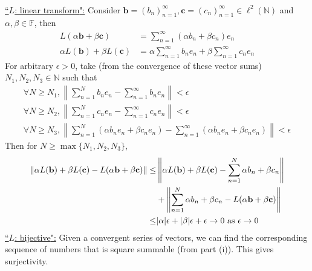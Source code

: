 \documentclass[12pt,a4paper]{article}
\newcommand{\ra}[1]{\ifnum #1=1\rightarrow\fi\ifnum #1=2\Rightarrow\fi}
\newcommand{\claim}[1]{\underline{``{#1}":}}
\newcommand{\bga}{\begin{align*}}
\renewcommand{\l}{\left}\renewcommand{\r}{\right}
\newcommand{\SUM}[2]{\sum\limits_{#1}^{#2}}
\newcommand{\N}{\mathbb N}%
\begin{document}
\\
\claim{$L$: linear transform} Consider $\mathbf b = (b_n)_{n=1}^\infty, \mathbf c = (c_n)_{n=1}^\infty \in \ell^2(\N)$ and $\alpha, \beta \in \mathbb F$, then 
\bga
L(\alpha \mathbf b + \beta \mathbf c)
& = \SUM{n=1}\infty (\alpha b_n + \beta c_n)e_n \\
\alpha L(\mathbf b) + \beta L(\mathbf c) & = \alpha\SUM{n=1}\infty b_ne_n + \beta\SUM{n=1}\infty c_ne_n
\end{align*}
For arbitrary $\epsilon > 0$, take (from the convergence of these vector sums) $N_1, N_2, N_3 \in \N$ such that 
$$\begin{array}{c}
\forall N \geq N_1, \l\|\SUM{n=1}N b_ne_n - \SUM{n=1}\infty b_ne_n \r\| < \epsilon \\
\forall N \geq N_2, \l\|\SUM{n=1}N c_ne_n - \SUM{n=1}\infty c_ne_n \r\| < \epsilon \\ 
\forall N \geq N_3, \l\|\SUM{n=1}N (\alpha b_ne_n + \beta c_n e_n) - \SUM{n=1}\infty (\alpha b_ne_n + \beta c_ne_n) \r\| < \epsilon 
\end{array}$$
Then for $N \geq \max\{N_1, N_2, N_3\}$, 
\bga
\l\|\alpha L(\mathbf b) + \beta L(\mathbf c) - L(\alpha \mathbf b + \beta \mathbf c)\r\|
\leq&  \l\|\alpha L(\mathbf b) + \beta L(\mathbf c) - \SUM{n=1}N \alpha b_n + \beta c_n\r\| \\
& + \l\|\SUM{n=1}N \alpha b_n + \beta c_n - L(\alpha \mathbf b + \beta \mathbf c)\r\| \\
\leq & |\alpha|\epsilon + |\beta|\epsilon + \epsilon \ra1 0 \text{ as } \epsilon \ra1 0
\end{align*}
\claim{$L$: bijective} Given a convergent series of vectors, we can find the corresponding sequence of numbers that is square summable (from part (i)). This gives surjectivity. 
\end{document}
